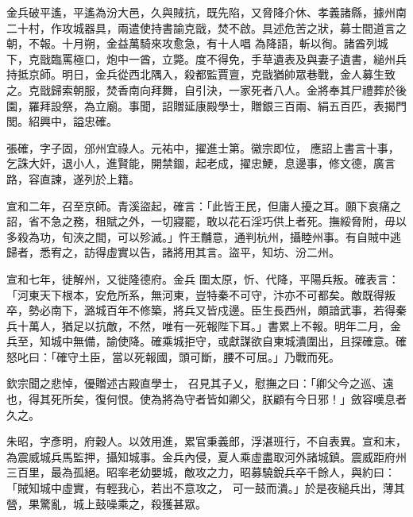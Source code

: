 \begin{pinyinscope}
 金兵破平遙，平遙為汾大邑，久與賊抗，既先陷，又脅降介休、孝義諸縣，據州南二十村，作攻城器具，兩遣使持書諭克戩，焚不啟。具述危苦之狀，募士間道言之朝，不報。十月朔，金益萬騎來攻愈急，有十人唱
 為降語，斬以徇。諸酋列城下，克戩臨罵極口，炮中一酋，立斃。度不得免，手草遺表及與妻子遺書，縋州兵持抵京師。明日，金兵從西北隅入，殺都監賈亶，克戩猶帥眾巷戰，金人募生致之。克戩歸索朝服，焚香南向拜舞，自引決，一家死者八人。金將奉其尸禮葬於後園，羅拜設祭，為立廟。事聞，詔贈延康殿學士，贈銀三百兩、絹五百匹，表揭門閭。紹興中，謚忠確。



 張確，字子固，邠州宜祿人。元祐中，擢進士第。徽宗即位，
 應詔上書言十事，乞誅大奸，退小人，進賢能，開禁錮，起老成，擢忠鯁，息邊事，修文德，廣言路，容直諫，遂列於上籍。



 宣和二年，召至京師。青溪盜起，確言：「此皆王民，但庸人擾之耳。願下哀痛之詔，省不急之務，租賦之外，一切寢罷，敢以花石淫巧供上者死。撫綏脅附，毋以多殺為功，旬浹之間，可以殄滅。」忤王黼意，通判杭州，攝睦州事。有自賊中逃歸者，悉宥之，訪得虛實以告，諸將用其言。盜平，知坊、汾二州。



 宣和七年，徙解州，又徙隆德府。金兵
 圍太原，忻、代降，平陽兵叛。確表言：「河東天下根本，安危所系，無河東，豈特秦不可守，汴亦不可都矣。敵既得叛卒，勢必南下，潞城百年不修築，將兵又皆戍邊。臣生長西州，頗諳武事，若得秦兵十萬人，猶足以抗敵，不然，唯有一死報陛下耳。」書累上不報。明年二月，金兵至，知城中無備，諭使降。確乘城拒守，或獻謀欲自東城潰圍出，且探確意。確怒叱曰：「確守土臣，當以死報國，頭可斷，腰不可屈。」乃戰而死。



 欽宗聞之悲悼，優贈述古殿直學士，
 召見其子乂，慰撫之曰：「卿父今之巡、遠也，得其死所矣，復何恨。使為將為守者皆如卿父，朕顧有今日邪！」斂容嘆息者久之。



 朱昭，字彥明，府穀人。以效用進，累官秉義郎，浮湛班行，不自表異。宣和末，為震威城兵馬監押，攝知城事。金兵內侵，夏人乘虛盡取河外諸城鎮。震威距府州三百里，最為孤絕。昭率老幼嬰城，敵攻之力，昭募驍銳兵卒千餘人，與約曰：「賊知城中虛實，有輕我心，若出不意攻之，
 可一鼓而潰。」於是夜縋兵出，薄其營，果驚亂，城上鼓噪乘之，殺獲甚眾。




\end{pinyinscope}
